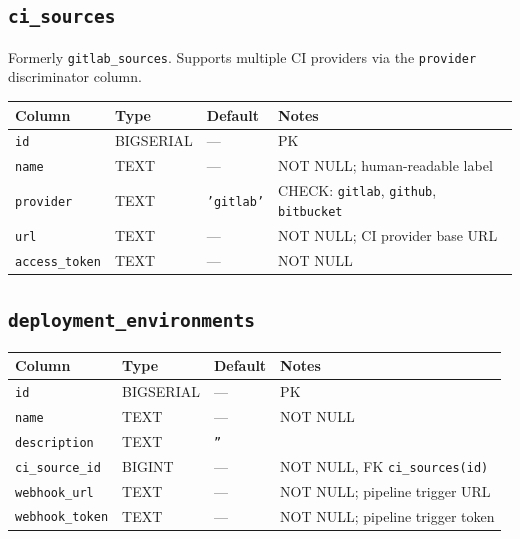 \documentclass[12pt,a4paper,twoside]{report}
\newcommand{\code}[1]{\texttt{#1}}
\begin{document}
\subsection*{\texttt{ci\_sources}}

Formerly \code{gitlab\_sources}. Supports multiple CI providers via the
\code{provider} discriminator column.

\begin{table}[H]
  \centering\small
  \begin{tabular}{@{}llll@{}}
    \toprule
    \textbf{Column} & \textbf{Type} & \textbf{Default} & \textbf{Notes} \\
    \midrule
    \code{id}           & BIGSERIAL & ---              & PK \\
    \code{name}         & TEXT      & ---              & NOT NULL; human-readable label \\
    \code{provider}     & TEXT      & \code{'gitlab'}  & CHECK: \code{gitlab}, \code{github}, \code{bitbucket} \\
    \code{url}          & TEXT      & ---              & NOT NULL; CI provider base URL \\
    \code{access\_token}& TEXT      & ---              & NOT NULL \\
    \bottomrule
  \end{tabular}
\end{table}

\subsection*{\texttt{deployment\_environments}}

\begin{table}[H]
  \centering\small
  \begin{tabular}{@{}llll@{}}
    \toprule
    \textbf{Column} & \textbf{Type} & \textbf{Default} & \textbf{Notes} \\
    \midrule
    \code{id}              & BIGSERIAL & ---       & PK \\
    \code{name}            & TEXT      & ---       & NOT NULL \\
    \code{description}     & TEXT      & \code{''} & \\
    \code{ci\_source\_id}  & BIGINT    & ---       & NOT NULL, FK \textrightarrow{} \code{ci\_sources(id)} \\
    \code{webhook\_url}    & TEXT      & ---       & NOT NULL; pipeline trigger URL \\
    \code{webhook\_token}  & TEXT      & ---       & NOT NULL; pipeline trigger token \\
    \bottomrule
  \end{tabular}
\end{table}
\end{document}
